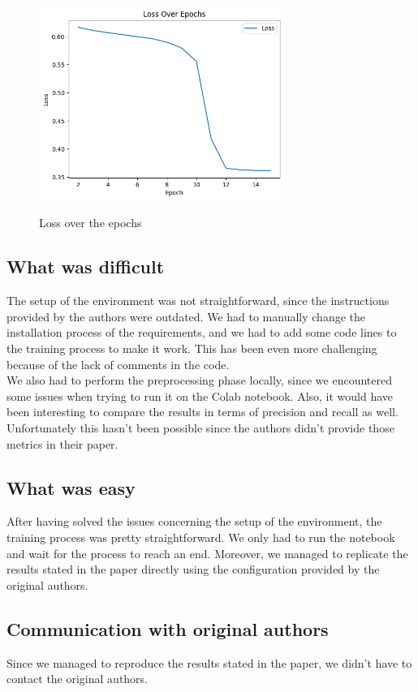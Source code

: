 \begin{figure}[!ht]
    \centering
    \caption{Loss over the epochs}
    \includegraphics[width=8cm]{images/Loss.png}
    \label{fig:loss}
\end{figure}

\subsection{What was difficult}

The setup of the environment was not straightforward, since the instructions provided by the authors were outdated. We had to manually change the installation process of the requirements, and we had to add some code lines to the training process to make it work. This has been even more challenging because of the lack of comments in the code. \\
We also had to perform the preprocessing phase locally, since we encountered some issues when trying to run it on the Colab notebook. Also, it would have been interesting to compare the results in terms of precision and recall as well. Unfortunately this hasn't been possible since the authors didn't provide those metrics in their paper. 

\subsection{What was easy}
After having solved the issues concerning the setup of the environment, the training process was pretty straightforward. We only had to run the notebook and wait for the process to reach an end. Moreover, we managed to replicate the results stated in the paper directly using the configuration provided by the original authors. 


\subsection{Communication with original authors}
Since we managed to reproduce the results stated in the paper, we didn't have to contact the original authors.
